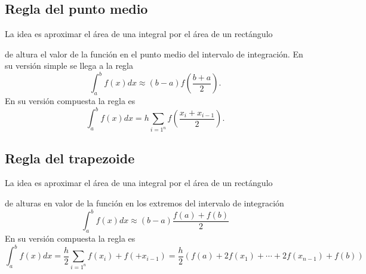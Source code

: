 \documentclass[11pt]{article}
\begin{document}
\subsection{Regla del punto medio} 
La idea es aproximar el \'area de una integral por el \'area de un rect\'angulo
\begin{center}
\end{center}
de altura el valor de la funci\'on en el punto medio del intervalo de integraci\'on. En su versi\'on simple se llega a la regla
$$\int_a^bf(x)dx\approx(b-a)f\left(\frac{b+a}{2}\right).$$
En su versi\'on compuesta la regla es
$$\int_a^b f(x)dx = h\sum_{i=1^n}f\left(\frac{x_{i}+x_{i-1}}{2}\right).$$

\subsection{Regla del trapezoide}
La idea es aproximar el \'area de una integral por el \'area de un rect\'angulo
\begin{center}
\end{center}
de alturas en valor de la funci\'on en los extremos del intervalo de integraci\'on
$$\int_a^bf(x)dx\approx(b-a)\frac{f(a)+f(b)}{2}$$
En su versi\'on compuesta la regla es
$$\int_a^b f(x)dx = \frac{h}{2}\sum_{i=1^n}f(x_{i})+f(+x_{i-1})=\frac{h}{2}\left(f(a)+2f(x_1)+\cdots +2f(x_{n-1})+f(b)\right)$$
\end{document}
